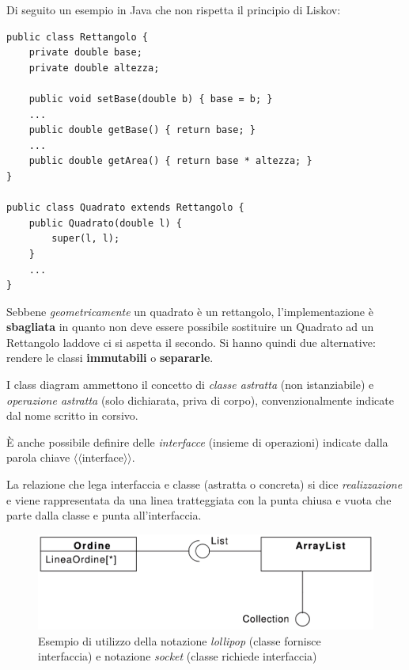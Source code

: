 Di seguito un esempio in Java che non rispetta il principio di Liskov:
\begin{verbatim}
public class Rettangolo {
    private double base;
    private double altezza;

    public void setBase(double b) { base = b; }
    ...
    public double getBase() { return base; }
    ...
    public double getArea() { return base * altezza; }
}

public class Quadrato extends Rettangolo {
    public Quadrato(double l) {
        super(l, l);
    }
    ...
}
\end{verbatim}

Sebbene \textit{geometricamente} un quadrato è un rettangolo, l'implementazione è \textbf{sbagliata} in quanto non deve essere possibile sostituire un Quadrato ad un Rettangolo laddove ci si aspetta il secondo. Si hanno quindi due alternative: rendere le classi \textbf{immutabili} o \textbf{separarle}.

I class diagram ammettono il concetto di \textit{classe astratta} (non istanziabile) e \textit{operazione astratta} (solo dichiarata, priva di corpo), convenzionalmente indicate dal nome scritto in corsivo.

È anche possibile definire delle \textit{interfacce} (insieme di operazioni) indicate dalla parola chiave $\langle\langle$interface$\rangle\rangle$.

La relazione che lega interfaccia e classe (astratta o concreta) si dice \textit{realizzazione} e viene rappresentata da una linea tratteggiata con la punta chiusa e vuota che parte dalla classe e punta all'interfaccia.

\begin{figure}[H]
    \centering
    \includegraphics[width=0.6\linewidth]{assets/UML/class/class-9.png}
    \caption{Esempio di utilizzo della notazione \textit{lollipop} (classe fornisce interfaccia) e notazione \textit{socket} (classe richiede interfaccia)}
\end{figure}

